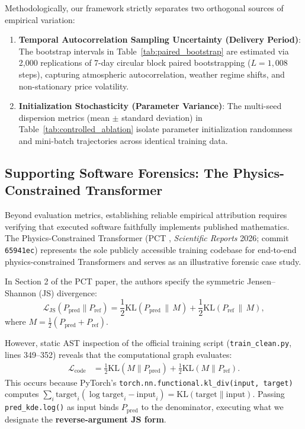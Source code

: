 Methodologically, our framework strictly separates two orthogonal sources of empirical variation:
\begin{enumerate}[leftmargin=*]
\item \textbf{Temporal Autocorrelation Sampling Uncertainty (Delivery Period)}: The bootstrap intervals in Table~\ref{tab:paired_bootstrap} are estimated via 2,000 replications of 7-day circular block paired bootstrapping ($L=1{,}008$ steps), capturing atmospheric autocorrelation, weather regime shifts, and non-stationary price volatility.
\item \textbf{Initialization Stochasticity (Parameter Variance)}: The multi-seed dispersion metrics (mean $\pm$ standard deviation) in Table~\ref{tab:controlled_ablation} isolate parameter initialization randomness and mini-batch trajectories across identical training data.
\end{enumerate}

\subsection{Supporting Software Forensics: The Physics-Constrained Transformer}
Beyond evaluation metrics, establishing reliable empirical attribution requires verifying that executed software faithfully implements published mathematics. The Physics-Constrained Transformer (PCT \cite{pct2026}, \textit{Scientific Reports} 2026; commit \texttt{65941ec}) represents the sole publicly accessible training codebase for end-to-end physics-constrained Transformers and serves as an illustrative forensic case study.

In Section 2 of the PCT paper, the authors specify the symmetric Jensen--Shannon (JS) divergence:
\begin{equation}
\mathcal{L}_{\text{JS}}(P_{\text{pred}} \parallel P_{\text{ref}}) = \frac{1}{2} \text{KL}\left(P_{\text{pred}} \,\Big\|\, M\right) + \frac{1}{2} \text{KL}\left(P_{\text{ref}} \,\Big\|\, M\right),
\label{eq:js_divergence}
\end{equation}
where $M = \frac{1}{2}(P_{\text{pred}} + P_{\text{ref}})$.

However, static AST inspection of the official training script (\texttt{train\_clean.py}, lines 349--352) reveals that the computational graph evaluates:
\begin{equation}
\begin{split}
\mathcal{L}_{\text{code}} &= \frac{1}{2} \text{KL}\left(M \parallel P_{\text{pred}}\right) + \frac{1}{2} \text{KL}\left(M \parallel P_{\text{ref}}\right).
\end{split}
\label{eq:reverse_js}
\end{equation}
This occurs because PyTorch's \texttt{torch.nn.functional.kl\_div(input, target)} computes $\sum_i \text{target}_i (\log \text{target}_i - \text{input}_i) = \text{KL}(\text{target} \parallel \text{input})$. Passing \texttt{pred\_kde.log()} as input binds $P_{\text{pred}}$ to the denominator, executing what we designate the \textbf{reverse-argument JS form}.

